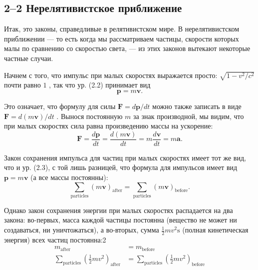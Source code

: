 \documentclass[11pt,oneside]{article}
\providecommand{\ddt}[2]{\frac{d#1}{d#2}}
\providecommand{\FLPF}{\mathbf{F}}
\providecommand{\FLPa}{\mathbf{a}}
\providecommand{\FLPp}{\mathbf{p}}
\providecommand{\FLPv}{\mathbf{v}}
\begin{document}
\subsection*{2--2 Нерелятивистское приближение}

Итак, это законы, справедливые в релятивистском мире. В нерелятивистском приближении --- то есть когда мы рассматриваем частицы, скорости которых малы по сравнению со скоростью света, --- из этих законов вытекают некоторые частные случаи.\par

Начнем с того, что импульс при малых скоростях выражается просто: \(\sqrt{1-{v^2}/{c^2}}\) почти равно \(1\) , так что ур. (2.2) принимает вид 
\begin{equation*} \tag{2.6}
\label{Eq:TIPS:2:6} \FLPp = m\FLPv. \end{equation*}
\par

Это означает, что формулу для силы \(\FLPF = d\FLPp/dt\) можно также записать в виде \(\FLPF = d(m\FLPv)/dt\) . Вынося постоянную \(m\) за знак производной, мы видим, что при малых скоростях сила равна произведению массы на ускорение: 
\begin{equation*} \tag{2.7}
\label{Eq:TIPS:2:7} \FLPF = \ddt{\FLPp}{t} = \ddt{(m\FLPv)}{t} = m\ddt{\FLPv}{t} = m\FLPa. \end{equation*}
\par

Закон сохранения импульса для частиц при малых скоростях имеет тот же вид, что и ур. (2.3), с той лишь разницей, что формула для импульсов имеет вид \(\FLPp = m\FLPv\) (а все массы постоянны): 
\begin{equation*} \tag{2.8}
\label{Eq:TIPS:2:8} \sum_\text{particles} (m\FLPv)_\text{after} = \sum_\text{particles} (m\FLPv)_\text{before}. \end{equation*}
\par

Однако закон сохранения энергии при малых скоростях распадается на два закона: во-первых, масса каждой частицы постоянна (вещество не может ни создаваться, ни уничтожаться), а во-вторых, сумма \(\frac12mv^2\text{s}\) (полная кинетическая энергия) всех частиц постоянна:2 
\begin{equation*} \begin{aligned} m_\text{after} &= m_\text{before}\\[1ex] \sum_\text{particles} ({\textstyle\frac12}mv^2)_\text{after} &= \sum_\text{particles} ({\textstyle\frac12}mv^2)_\text{before}\\ \end{aligned} \tag{2.9}
\label{Eq:TIPS:2:9} \end{equation*}
\par
\end{document}
